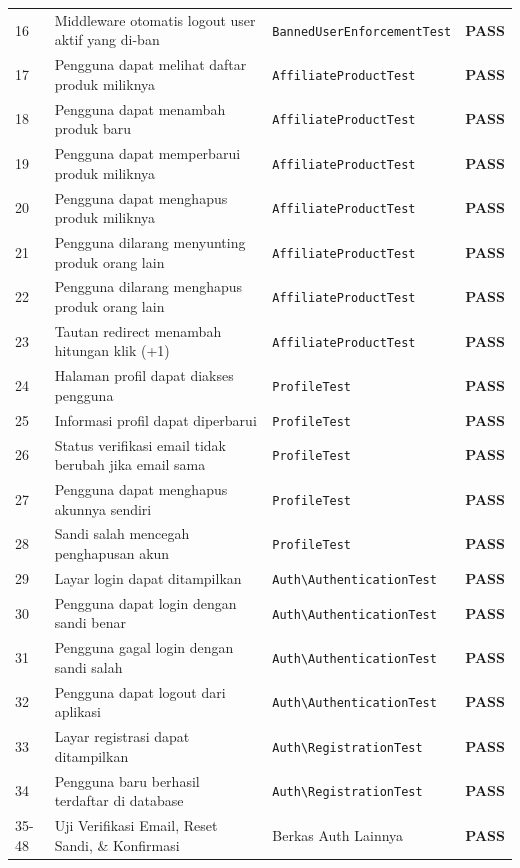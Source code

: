 \documentclass[12pt,a4paper]{article}
\begin{document}
\begin{longtable}{p{0.5cm}p{6.8cm}p{4.5cm}c}
16 & Middleware otomatis logout user aktif yang di-ban & \texttt{BannedUserEnforcementTest} & \textbf{PASS} \\
17 & Pengguna dapat melihat daftar produk miliknya & \texttt{AffiliateProductTest} & \textbf{PASS} \\
18 & Pengguna dapat menambah produk baru & \texttt{AffiliateProductTest} & \textbf{PASS} \\
19 & Pengguna dapat memperbarui produk miliknya & \texttt{AffiliateProductTest} & \textbf{PASS} \\
20 & Pengguna dapat menghapus produk miliknya & \texttt{AffiliateProductTest} & \textbf{PASS} \\
21 & Pengguna dilarang menyunting produk orang lain & \texttt{AffiliateProductTest} & \textbf{PASS} \\
22 & Pengguna dilarang menghapus produk orang lain & \texttt{AffiliateProductTest} & \textbf{PASS} \\
23 & Tautan redirect menambah hitungan klik (+1) & \texttt{AffiliateProductTest} & \textbf{PASS} \\
24 & Halaman profil dapat diakses pengguna & \texttt{ProfileTest} & \textbf{PASS} \\
25 & Informasi profil dapat diperbarui & \texttt{ProfileTest} & \textbf{PASS} \\
26 & Status verifikasi email tidak berubah jika email sama & \texttt{ProfileTest} & \textbf{PASS} \\
27 & Pengguna dapat menghapus akunnya sendiri & \texttt{ProfileTest} & \textbf{PASS} \\
28 & Sandi salah mencegah penghapusan akun & \texttt{ProfileTest} & \textbf{PASS} \\
29 & Layar login dapat ditampilkan & \texttt{Auth\textbackslash AuthenticationTest} & \textbf{PASS} \\
30 & Pengguna dapat login dengan sandi benar & \texttt{Auth\textbackslash AuthenticationTest} & \textbf{PASS} \\
31 & Pengguna gagal login dengan sandi salah & \texttt{Auth\textbackslash AuthenticationTest} & \textbf{PASS} \\
32 & Pengguna dapat logout dari aplikasi & \texttt{Auth\textbackslash AuthenticationTest} & \textbf{PASS} \\
33 & Layar registrasi dapat ditampilkan & \texttt{Auth\textbackslash RegistrationTest} & \textbf{PASS} \\
34 & Pengguna baru berhasil terdaftar di database & \texttt{Auth\textbackslash RegistrationTest} & \textbf{PASS} \\
35-48 & Uji Verifikasi Email, Reset Sandi, \& Konfirmasi & Berkas Auth Lainnya & \textbf{PASS} \\
\end{longtable}
\end{document}
